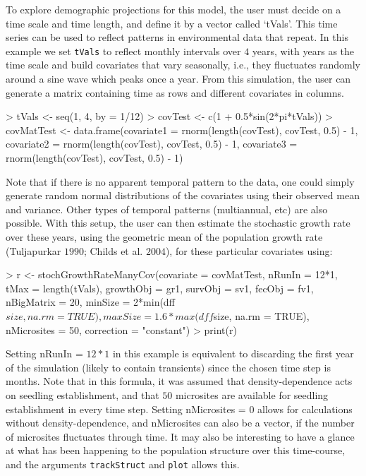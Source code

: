 \documentclass{article}
\begin{document}
To explore demographic projections for this model, the user must decide on
a time scale and time length, and define it by a vector called
`tVals'.  This time series can be used to reflect patterns in environmental data
that repeat.  In this example we set {\tt tVals} to reflect monthly intervals
over $4$ years, with years as the time scale and build covariates that vary
seasonally, i.e., they fluctuates randomly around a sine wave which peaks once a
year.  From this simulation, the user can generate a matrix containing time as
rows and different covariates in columns.
\begin{Schunk}
\begin{Sinput}
> tVals <- seq(1, 4, by = 1/12)
> covTest <- c(1 + 0.5*sin(2*pi*tVals))
> covMatTest <- data.frame(covariate1 = rnorm(length(covTest), covTest, 0.5) - 1, 
                           covariate2 = rnorm(length(covTest), covTest, 0.5) - 1, 
                           covariate3 = rnorm(length(covTest), covTest, 0.5) - 1)
\end{Sinput}
\end{Schunk}
Note that  if there is no apparent temporal pattern to the data, one could
simply generate random normal distributions of the covariates using their observed mean and variance. Other types of temporal patterns (multiannual, etc) are also possible. With this setup, the user can then estimate the stochastic growth rate over these years, using the geometric mean of the population growth rate (Tuljapurkar $1990$; Childs et al. $2004$), for these particular covariates using:
\begin{Schunk}
\begin{Sinput}
> r <- stochGrowthRateManyCov(covariate = covMatTest, nRunIn = 12*1, 
                              tMax = length(tVals), growthObj = gr1, 
                              survObj = sv1, fecObj = fv1, nBigMatrix = 20, 
                              minSize = 2*min(dff$size, na.rm = TRUE), 
                              maxSize = 1.6*max(dff$size, na.rm = TRUE), 
                              nMicrosites = 50, correction = "constant")
> print(r)
\end{Sinput}
\end{Schunk}
Setting nRunIn = $12*1$ in this example is equivalent to discarding the first 
year of the simulation (likely to contain transients) since the chosen time step
is months. Note that in this formula, it was assumed that density-dependence acts on
seedling establishment, and that $50$ microsites are available for seedling
establishment in every time step. Setting nMicrosites = $0$ allows for
calculations without density-dependence, and nMicrosites can also be a vector,
if the number of microsites fluctuates through time. It may also be interesting
to have a glance at what has been happening to the population structure over
this time-course, and the arguments {\tt trackStruct} and {\tt plot} allows this.
\end{document}
